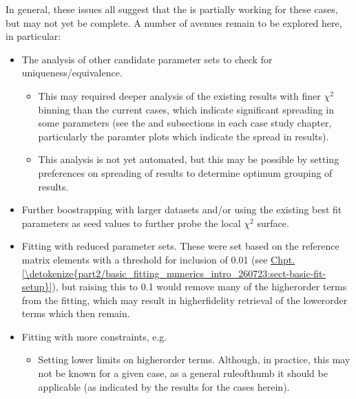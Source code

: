 \documentclass[letterpaper,table,10pt,english]{jupyterBook}
\begin{document}
\sphinxAtStartPar
In general, these issues all suggest that the {\hyperref[\detokenize{backmatter/glossary:term-bootstrap-retrieval-protocol}]{}} is partially working for these cases, but may not yet be complete. A number of avenues remain to be explored here, in particular:
\begin{itemize}
\item {} 
\sphinxAtStartPar
The analysis of other candidate parameter sets to check for uniqueness/equivalence.
\begin{itemize}
\item {} 
\sphinxAtStartPar
This may required deeper analysis of the existing results with finer \(\chi^2\) binning than the current cases, which indicate significant spreading in some parameters (see the  and  subsections in each case study chapter, particularly the paramter plots which indicate the spread in results).

\item {} 
\sphinxAtStartPar
This analysis is not yet automated, but this may be possible by setting preferences on spreading of results to determine optimum grouping of results.

\end{itemize}

\item {} 
\sphinxAtStartPar
Further boostrapping with larger datasets and/or using the existing best fit parameters as seed values to further probe the local \(\chi^2\) surface.

\item {} 
\sphinxAtStartPar
Fitting with reduced parameter sets. These were set based on the reference matrix elements with a threshold for inclusion of 0.01 (see \hyperref[\detokenize{part2/basic_fitting_numerics_intro_260723:sect-basic-fit-setup}]{Chpt.\@ \ref{\detokenize{part2/basic_fitting_numerics_intro_260723:sect-basic-fit-setup}}}), but raising this to 0.1 would remove many of the higher\sphinxhyphen{}order terms from the fitting, which may result in higher\sphinxhyphen{}fidelity retrieval of the lower\sphinxhyphen{}order terms which then remain.

\item {} 
\sphinxAtStartPar
Fitting with more constraints, e.g.
\begin{itemize}
\item {} 
\sphinxAtStartPar
Setting lower limits on higher\sphinxhyphen{}order terms. Although, in practice, this may not be known  for a given case, as a general rule\sphinxhyphen{}of\sphinxhyphen{}thumb it should be applicable (as indicated by the  results for the cases herein).


\end{itemize}
\end{itemize}
\end{document}
